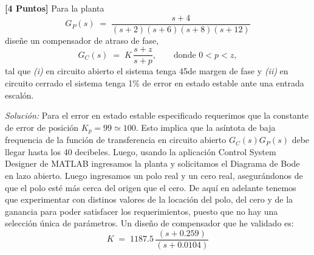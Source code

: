 \documentclass[ a4paper, twoside, 11pt]{article}
\begin{document}
\begin{problem}
\textbf{[4 Puntos]} Para la planta 
\[
G_P(s) \; = \; 
\frac{s+4}{(s+2)(s+6)(s+8)(s+12)}
\]
dise\~ne un compensador de atraso de fase, \ie
\[
G_C(s) \; = \; K \, \frac{s+z}{s+p}, 
\qquad \text{donde } 0 < p < z,
\]
tal que \emph{(i)} en circuito abierto el sistema tenga 45\deg de margen de fase y \emph{(ii)} en circuito cerrado el sistema tenga 1\% de error en estado estable ante una entrada escal\'on. 

\emph{Soluci\'on:} Para el error en estado estable especificado requerimos que la constante de error de posici\'on $K_p = 99 \simeq 100$. Esto implica que la as\'intota de baja frequencia de la funci\'on de transferencia en circuito abierto $G_C(s) G_P(s)$ debe llegar hasta los 40 decibeles. Luego, usando la aplicaci\'on Control System Designer de MATLAB ingresamos la planta y solicitamos el Diagrama de Bode en lazo abierto. Luego ingresamos un polo real y un cero real, asegur\'andonos de que el polo est\'e m\'as cerca del origen que el cero. De aqu\'i en adelante tenemos que experimentar con distinos valores de la locaci\'on del polo, del cero y de la ganancia para poder satisfacer los requerimientos, puesto que no hay una selecci\'on \'unica de par\'ametros. Un dise\~no de compensador que he validado es: 
\[
K \; = \; 1187.5 \, \frac{(s+0.259)}{(s+0.0104)}
\]

\end{problem}
\fullskip
\end{document}
